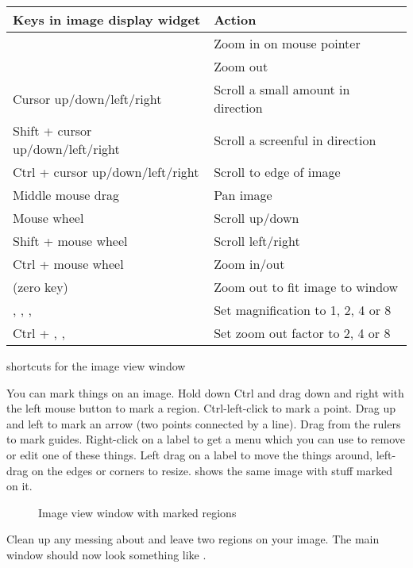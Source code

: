 \begin{tab2}
\begin{center}
\begin{tabular}{||l|l||}
\hline
Keys in image display widget  		& Action \\
\hline
\ct{i} 					& Zoom in on mouse pointer \\
\ct{o} 					& Zoom out \\
Cursor up/down/left/right 		& Scroll a small amount in direction \\
Shift + cursor up/down/left/right 	& Scroll a screenful in direction \\
Ctrl + cursor up/down/left/right 	& Scroll to edge of image \\
Middle mouse drag 			& Pan image \\
Mouse wheel 				& Scroll up/down \\
Shift + mouse wheel			& Scroll left/right \\
Ctrl + mouse wheel 			& Zoom in/out \\
\ct{0} (zero key) 			& Zoom out to fit image to window \\
\ct{1}, \ct{2}, \ct{4}, \ct{8}  	& Set magnification to 1, 2, 4 or 8 \\
Ctrl + \ct{2}, \ct{4}, \ct{8} 		& Set zoom out factor to 2, 4 or 8 \\
\hline
\end{tabular}
\end{center}

\caption{\nip{} shortcuts for the image view window}
\end{tab2}

You can mark things on an image. Hold down Ctrl and drag down and right with
the left mouse button to mark a region. Ctrl-left-click to mark a point. Drag
up and left to mark an arrow (two points connected by a line). Drag from
the rulers to mark guides. Right-click on a label to get a menu which
you can use to remove or edit one of these things. Left drag on a label
to move the things around, left-drag on the edges or corners to resize.
 shows the same image with stuff marked on it.

\begin{figure}
\caption{Image view window with marked regions}
\end{figure}

Clean up any messing about and leave two regions on your image. The main
window should now look something like .

